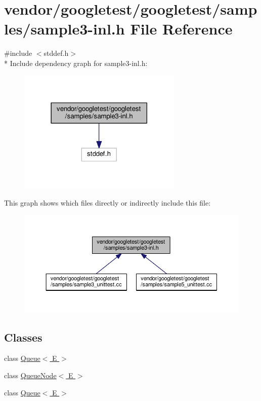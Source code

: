 \hypertarget{sample3-inl_8h}{}\section{vendor/googletest/googletest/samples/sample3-\/inl.h File Reference}
\label{sample3-inl_8h}
{\ttfamily \#include $<$stddef.\+h$>$}\\*
Include dependency graph for sample3-\/inl.h\+:\nopagebreak
\begin{figure}[H]
\begin{center}
\leavevmode
\includegraphics[width=222pt]{sample3-inl_8h__incl}
\end{center}
\end{figure}
This graph shows which files directly or indirectly include this file\+:\nopagebreak
\begin{figure}[H]
\begin{center}
\leavevmode
\includegraphics[width=350pt]{sample3-inl_8h__dep__incl}
\end{center}
\end{figure}
\subsection*{Classes}
\begin{DoxyCompactItemize}
\item 
class \hyperlink{classQueue}{Queue$<$ E $>$}
\item 
class \hyperlink{classQueueNode}{Queue\+Node$<$ E $>$}
\item 
class \hyperlink{classQueue}{Queue$<$ E $>$}
\end{DoxyCompactItemize}
